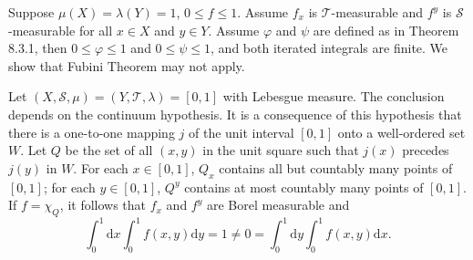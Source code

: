 Suppose $\mu(X)=\lambda(Y)=1$, $0\le f\le 1$. Assume $f_x$ is $\mathscr{T}$-measurable and $f^y$ is $\mathscr{S}$-measurable for all $x\in X$ and $y\in Y$. Assume $\varphi$ and $\psi$ are defined as in Theorem 8.3.1, then $0\le\varphi\le 1$ and $0\le\psi\le 1$, and both iterated integrals are finite. We show that Fubini Theorem may not apply.\par
Let $(X,\mathscr{S},\mu)=(Y,\mathscr{T},\lambda)=[0,1]$ with Lebesgue measure. The conclusion depends on the continuum hypothesis. It is a consequence of this hypothesis that there is a one-to-one mapping $j$ of the unit interval $[0,1]$ onto a well-ordered set $W$. Let $Q$ be the set of all $(x,y)$ in the unit square such that $j(x)$ precedes $j(y)$ in $W$. For each $x\in[0,1]$, $Q_x$ contains all but countably many points of $[0,1]$; for each $y\in[0,1]$, $Q^y$ contains at most countably many points of $[0,1]$. If $f=\chi_Q$, it follows that $f_x$ and $f^y$ are Borel measurable and 
$$
\int_0^1{\mathrm{d}x\int_0^1{f\left( x,y \right) \mathrm{d}y}}=1\ne 0=\int_0^1{\mathrm{d}y\int_0^1{f\left( x,y \right) \mathrm{d}x}}.
$$
